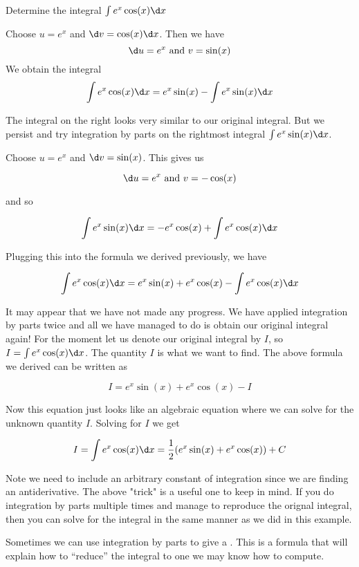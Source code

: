 \documentclass{ximera}
\begin{document}
\begin{example}
Determine the integral $\int e^{x}\cos(x) \d x$
\begin{explanation}

Choose $u=e^{x}$ and $\d v=\cos(x) \d x$. 
Then we have 
\[
\d u =e^{x} \text{ and }  v=\sin(x) 
\]
We obtain the integral
\[
\int e^{x} \cos(x) \d x= e^{x} \sin(x) - \int e^{x} \sin(x) \d x
\]

The integral on the right looks very similar to our original integral. But we persist and try integration by parts on the rightmost integral $\int e^{x} \sin(x) \d x$. 

Choose $u=e^{x}$ and $\d v= \sin(x)$. 
This gives us 

\[
\d u=e^{x} \text{ and } v=-\cos(x)
\]

and so 

\[
\int e^{x}\sin(x) \d x= -e^{x}\cos(x) + \int e^{x} \cos(x) \d x
\]

Plugging this into the formula we derived previously, we have

\[ 
\int e^{x} \cos(x) \d x=e^{x} \sin(x)+e^{x} \cos(x) - \int e^{x} \cos(x) \d x
\]

It may appear that we have not made any progress. We have applied integration by parts twice and all we have managed to do is obtain our original integral again! For the moment let us denote our original integral by $I$, so $I=\int e^{x} \cos(x) \d x$. The quantity $I$ is what we want to find. The above formula we derived can be written as 

\[
 I = e^{x} \sin(x) +e^{x} \cos(x) -I
\] 

Now this equation just looks like an algebraic equation where we can solve for the unknown quantity $I$. 
Solving for $I$ we get 

\[
 I=\int e^{x}\cos(x) \d x= \frac{1}{2} ( e^{x} \sin(x) +e^{x} \cos(x) ) + C
\]

Note we need to include an arbitrary constant of integration since we are finding an antiderivative. The above "trick" is a useful one to keep in mind. If you do integration by parts multiple times and manage to reproduce the orignal integral, then you can solve for the integral in the same manner as we did in this example. 
\end{explanation}
\end{example}



Sometimes we can use integration by parts to give a .
This is a formula that will explain how to ``reduce''
the integral to one we may know how to compute.
\end{document}
